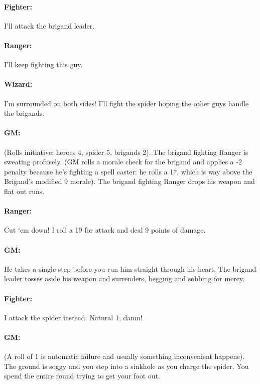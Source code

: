 \begin{multicols}{2}
\paragraph{Fighter:}  I'll attack the brigand leader.

\paragraph{Ranger:}  I'll keep fighting this guy.

\paragraph{Wizard:}  I'm surrounded on both sides!  I'll fight the spider hoping the other guys handle the brigands.

\paragraph{GM:}  (Rolls initiative: heroes 4, spider 5, brigands 2).  The brigand fighting Ranger is sweating profusely.  (GM rolls a morale check for the brigand and applies a -2 penalty because he's fighting a spell caster: he rolls a 17, which is way above the Brigand's modified 9 morale).  The brigand fighting Ranger drops his weapon and flat out runs.  

\paragraph{Ranger:}  Cut `em down!  I roll a 19 for attack and deal 9 points of damage.

\paragraph{GM:}  He takes a single step before you run him straight through his heart.  The brigand leader tosses aside his weapon and surrenders, begging and sobbing for mercy.

\paragraph{Fighter:}  I attack the spider instead.  Natural 1, damn!

\paragraph{GM:}  (A roll of 1 is automatic failure and usually something inconvenient happens).  The ground is soggy and you step into a sinkhole as you charge the spider.  You spend the entire round trying to get your foot out.


\end{multicols}
